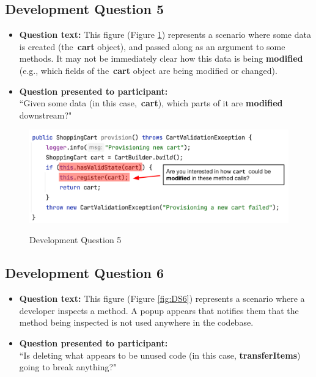 \subsection{Development Question 5}

\begin{itemize}
  \item[] \textbf{Question text:} This figure (Figure \ref{fig:DS5}) represents 
          a scenario where some data is created (the \textbf{cart} object), and
          passed along as an argument to some methods. It may not be 
          immediately clear how this data is being \textbf{modified} (e.g., 
          which fields of the \textbf{cart} object are being modified or changed).
  \item[] \textbf{Question presented to participant:}  \\
          ``Given some data (in this case, \textbf{cart}), which parts of it
          are \textbf{modified} downstream?"
\end{itemize}

\begin{figure}[ht]
\centering
\caption{Development Question 5}
\includegraphics[width=\textwidth]{./figs/ds5.png}
\label{fig:DS5}
\end{figure}

\subsection{Development Question 6}

\begin{itemize}
  \item[] \textbf{Question text:} This figure (Figure \ref{fig:DS6}) represents 
          a scenario where a developer inspects a method. A popup appears that 
          notifies them that the method being inspected is not used anywhere in 
          the codebase.
  \item[] \textbf{Question presented to participant:}  \\
         ``Is deleting what appears to be unused code (in this case, 
         \textbf{transferItems}) going to break anything?"
\end{itemize}

